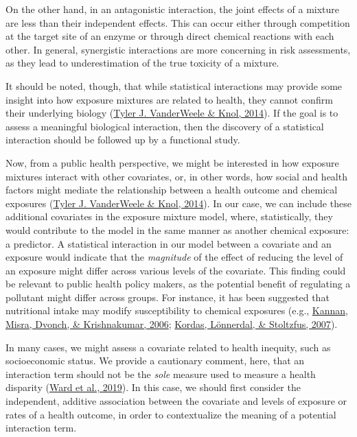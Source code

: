 \documentclass[12pt, twoside]{amherstthesis}
\begin{document}
On the other hand, in an antagonistic interaction, the joint effects of a mixture are less than their independent effects. This can occur either through competition at the target site of an enzyme or through direct chemical reactions with each other. In general, synergistic interactions are more concerning in risk assessments, as they lead to underestimation of the true toxicity of a mixture.

It should be noted, though, that while statistical interactions may provide some insight into how exposure mixtures are related to health, they cannot confirm their underlying biology (\protect\hyperlink{ref-vanderweele_tutorial_2014}{Tyler J. VanderWeele \& Knol, 2014}). If the goal is to assess a meaningful biological interaction, then the discovery of a statistical interaction should be followed up by a functional study.

Now, from a public health perspective, we might be interested in how exposure mixtures interact with other covariates, or, in other words, how social and health factors might mediate the relationship between a health outcome and chemical exposures (\protect\hyperlink{ref-vanderweele_tutorial_2014}{Tyler J. VanderWeele \& Knol, 2014}). In our case, we can include these additional covariates in the exposure mixture model, where, statistically, they would contribute to the model in the same manner as another chemical exposure: a predictor. A statistical interaction in our model between a covariate and an exposure would indicate that the \emph{magnitude} of the effect of reducing the level of an exposure might differ across various levels of the covariate. This finding could be relevant to public health policy makers, as the potential benefit of regulating a pollutant might differ across groups. For instance, it has been suggested that nutritional intake may modify susceptibility to chemical exposures (e.g., \protect\hyperlink{ref-kannan_exposures_2006}{Kannan, Misra, Dvonch, \& Krishnakumar, 2006}; \protect\hyperlink{ref-kordas_interactions_2007}{Kordas, Lönnerdal, \& Stoltzfus, 2007}).

In many cases, we might assess a covariate related to health inequity, such as socioeconomic status. We provide a cautionary comment, here, that an interaction term should not be the \emph{sole} measure used to measure a health disparity (\protect\hyperlink{ref-ward_how_2019}{Ward et al., 2019}). In this case, we should first consider the independent, additive association between the covariate and levels of exposure or rates of a health outcome, in order to contextualize the meaning of a potential interaction term.
\end{document}
